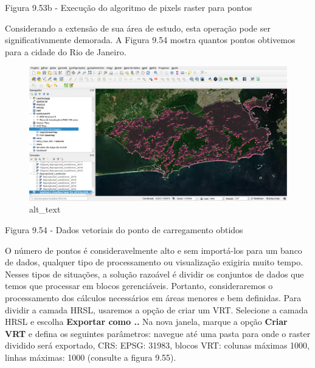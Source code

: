 \documentclass[
  portuguese,
]{krantz}
\begin{document}
Figura 9.53b - Execução do algoritmo de pixels raster para pontos

Considerando a extensão de sua área de estudo, esta operação pode ser significativamente demorada. A Figura 9.54 mostra quantos pontos obtivemos para a cidade do Rio de Janeiro.

\begin{figure}
\centering
\includegraphics{media/modulo9/fig954.png}
\caption{alt\_text}
\end{figure}

Figura 9.54 - Dados vetoriais do ponto de carregamento obtidos

O número de pontos é consideravelmente alto e sem importá-los para um banco de dados, qualquer tipo de processamento ou visualização exigiria muito tempo. Nesses tipos de situações, a solução razoável é dividir os conjuntos de dados que temos que processar em blocos gerenciáveis. Portanto, consideraremos o processamento dos cálculos necessários em áreas menores e bem definidas. Para dividir a camada HRSL, usaremos a opção de criar um VRT. Selecione a camada HRSL e escolha \textbf{Exportar como ..} Na nova janela, marque a opção \textbf{Criar VRT} e defina os seguintes parâmetros: navegue até uma pasta para onde o raster dividido será exportado, CRS: EPSG: 31983, blocos VRT: colunas máximas 1000, linhas máximas: 1000 (consulte a figura 9.55).
\end{document}

